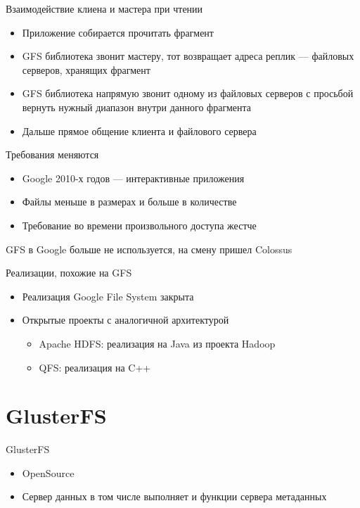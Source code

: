 \documentclass[sans]{beamer}
\begin{document}
\begin{frame}{Взаимодействие клиена и мастера при чтении}
	\begin{itemize}
		\item Приложение собирается прочитать фрагмент
		\item GFS библиотека звонит мастеру, тот возвращает адреса
		{\color{blue} реплик} --- файловых серверов, хранящих фрагмент
		\item GFS библиотека напрямую звонит одному из файловых серверов
		с просьбой вернуть нужный диапазон внутри данного фрагмента
		\item Дальше прямое общение клиента и файлового сервера
	\end{itemize}
\end{frame}

\begin{frame}{Требования меняются}
	\begin{itemize}
		\item Google 2010-х годов --- интерактивные приложения
		\item Файлы меньше в размерах и больше в количестве
		\item Требование во времени произвольного доступа жестче
	\end{itemize}
	\pause
	{\color{blue}
		GFS в Google больше не используется, на смену пришел Colossus
	}
\end{frame}

\begin{frame}{Реализации, похожие на GFS}
	\begin{itemize}
		\item Реализация Google File System закрыта
		\item Открытые проекты с аналогичной архитектурой
		\begin{itemize}
			\item Apache HDFS: реализация на Java из проекта Hadoop
			\item QFS: реализация на C++
		\end{itemize}
	\end{itemize}
\end{frame}

\section{GlusterFS}

\begin{frame}{GlusterFS}
	\begin{itemize}
		\item OpenSource
		\item Сервер данных в том числе выполняет и функции сервера метаданных
	\end{itemize}

\end{frame}
\end{document}

